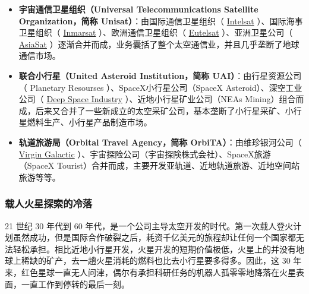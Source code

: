 \documentclass[letterpaper,10pt]{sphinxmanual}
\begin{document}
\begin{itemize}
\item {} 
\textbf{宇宙通信卫星组织（Universal Telecommunications Satellite Organization，简称 Unisat）}：由国际通信卫星组织（ \href{http://en.wikipedia.org/wiki/Intelsat}{Intelsat} ）、国际海事卫星组织（ \href{http://en.wikipedia.org/wiki/Inmarsat}{Inmarsat} ）、欧洲通信卫星组织（ \href{http://en.wikipedia.org/wiki/Eutelsat}{Eutelsat} ）、亚洲卫星公司（ \href{http://en.wikipedia.org/wiki/AsiaSat}{AsiaSat} ）逐渐合并而成，业务囊括了整个太空通信业，并且几乎垄断了地球通信市场。

\end{itemize}

\begin{itemize}
\item {} 
\textbf{联合小行星（United Asteroid Institution，简称 UAI）}：由行星资源公司（ Planetary Resourses ）、SpaceX小行星公司（SpaceX Asteroid）、深空工业公司（ \href{http://deepspaceindustries.com}{Deep Space Industry} ）、近地小行星矿业公司（NEAs Mining）组合而成，后来又合并了一些新成立的太空采矿公司，基本垄断了小行星采矿、小行星燃料生产、小行星产品制造市场。

\end{itemize}

\begin{itemize}
\item {} 
\textbf{轨道旅游局（Orbital Travel Agency，简称 OrbiTA）}：由维珍银河公司（ \href{http://en.wikipedia.org/wiki/Virgin\_Galactic}{Virgin Galactic} ）、宇宙探险公司（宇宙探険株式会社）、SpaceX旅游（SpaceX Tourist）合并而成，主要开发亚轨道、近地轨道旅游、近地空间站旅游等等。

\end{itemize}


\subsubsection{载人火星探索的冷落}
\label{history:id9}
21 世纪 30 年代到 60 年代，是一个公司主导太空开发的时代。第一次载人登火计划虽然成功，但是国际合作破裂之后，耗资千亿美元的旅程却让任何一个国家都无法轻松承担。相比近地小行星开发，火星开发的短期价值极低，火星上的并没有地球上稀缺的矿产，去一趟火星消耗的燃料也比去小行星要多得多。因此，这 30 年来，红色星球一直无人问津，偶尔有承担科研任务的机器人孤零零地降落在火星表面，一直工作到停转的最后一刻。
\end{document}
